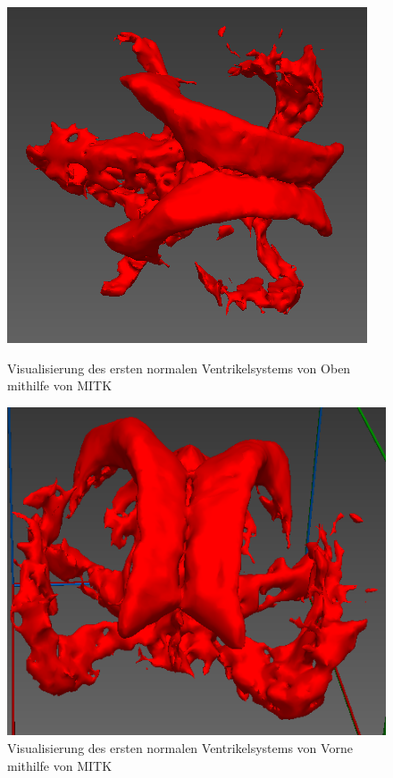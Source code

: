 \begin{figure}[h]
\begin{minipage}[b]{.5\textwidth}
  \centering
  \includegraphics[width=.98\linewidth, height=.98\linewidth]{Logos/Normal1_MITK/Oben.PNG}
  \caption{Visualisierung des ersten normalen Ventrikelsystems von Oben mithilfe von MITK}
  \label{fig:mitk_o}
\end{minipage}%
\begin{minipage}[b]{.5\textwidth}
  \centering
  \includegraphics[width=.98\linewidth, height=.98\linewidth]{Logos/Normal1_MITK/Schraeg_Vorne.PNG}
  \caption{Visualisierung des ersten normalen Ventrikelsystems von Vorne mithilfe von MITK}
  \label{fig:mitk_v}
\end{minipage}
\end{figure}


